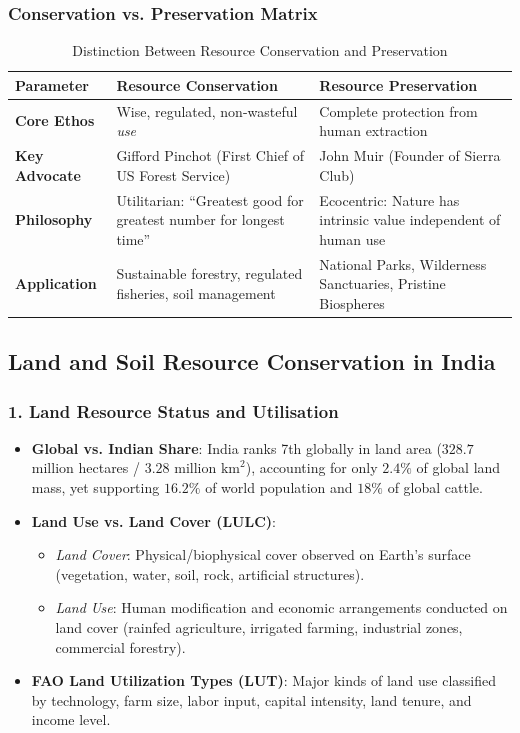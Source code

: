 \documentclass[11pt,a4paper]{article}
\begin{document}
\subsubsection{Conservation vs. Preservation Matrix}
\begin{table}[h!]
\centering
\small
\begin{tabularx}{\textwidth}{l X X}
\toprule
\textbf{Parameter} & \textbf{Resource Conservation} & \textbf{Resource Preservation} \\
\midrule
\textbf{Core Ethos} & Wise, regulated, non-wasteful \textit{use} & Complete protection from human extraction \\
\textbf{Key Advocate} & Gifford Pinchot (First Chief of US Forest Service) & John Muir (Founder of Sierra Club) \\
\textbf{Philosophy} & Utilitarian: ``Greatest good for greatest number for longest time'' & Ecocentric: Nature has intrinsic value independent of human use \\
\textbf{Application} & Sustainable forestry, regulated fisheries, soil management & National Parks, Wilderness Sanctuaries, Pristine Biospheres \\
\bottomrule
\end{tabularx}
\caption{Distinction Between Resource Conservation and Preservation}
\end{table}

\subsection{Land and Soil Resource Conservation in India}

\subsubsection{1. Land Resource Status and Utilisation}
\begin{itemize}[leftmargin=*]
  \item \textbf{Global vs. Indian Share}: India ranks 7th globally in land area ($328.7$ million hectares / $3.28$ million $\text{km}^2$), accounting for only $2.4\%$ of global land mass, yet supporting $16.2\%$ of world population and $18\%$ of global cattle.
  \item \textbf{Land Use vs. Land Cover (LULC)}:
  \begin{itemize}
    \item \textit{Land Cover}: Physical/biophysical cover observed on Earth's surface (vegetation, water, soil, rock, artificial structures).
    \item \textit{Land Use}: Human modification and economic arrangements conducted on land cover (rainfed agriculture, irrigated farming, industrial zones, commercial forestry).
  \end{itemize}
  \item \textbf{FAO Land Utilization Types (LUT)}: Major kinds of land use classified by technology, farm size, labor input, capital intensity, land tenure, and income level.
\end{itemize}
\end{document}
